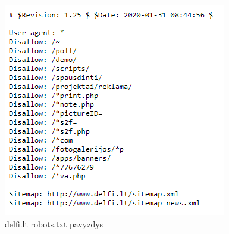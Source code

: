 \begin{figure}[htp!]
\centering
\includegraphics[scale=0.8]{img/rep_protocol.png}
\caption{delfi.lt robots.txt pavyzdys}
\label{fig:rep-example}
\end{figure}